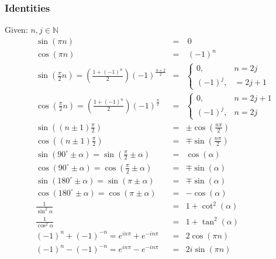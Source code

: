 \subsubsection{Identities}
Given: $n, j \in \mathbb{N}$
\begin{align*}
     & \sin(\pi n)                                                                      & = & \: 0                                                    \\
     & \cos(\pi n)                                                                      & = & \: {(-1)}^n                                             \\
     & \sin(\frac{\pi}{2}n) = \left(\frac{1 + {(-1)}^n}{2}\right){(-1)}^{\frac{n+2}{2}} & = & \begin{cases} 0, &n=2j \\ {(-1)}^j,&=2j+1 \end{cases}   \\
     & \cos(\frac{\pi}{2}n) = \left(\frac{1+{(-1)}^n}{2}\right){(-1)}^{\frac{n}{2}}     & = & \begin{cases} 0, &n=2j+1 \\ {(-1)}^j, &n=2j \end{cases} \\
     & \sin\left(\left(n\pm 1\right)\frac{\pi}{2}\right)                                & = & \pm \cos\left(\frac{n\pi}{2}\right)                     \\
     & \cos\left(\left(n\pm 1\right)\frac{\pi}{2}\right)                                & = & \mp \sin\left(\frac{n\pi}{2}\right)                     \\
     & \sin(90^\circ\pm\alpha) = \sin(\frac{\pi}{2} \pm \alpha)                         & = & \cos(\alpha)                                            \\
     & \cos(90^\circ\pm\alpha) = \cos(\frac{\pi}{2} \pm \alpha)                         & = & \mp\sin(\alpha)                                         \\
     & \sin(180^\circ\pm\alpha) = \sin(\pi \pm \alpha)                                  & = & \mp\sin(\alpha)                                         \\
     & \cos(180^\circ\pm\alpha) = \cos(\pi \pm \alpha)                                  & = & -\cos(\alpha)                                           \\
     & \frac{1}{\sin^2 \alpha}                                                          & = & 1+\cot^2 (\alpha)                                       \\
     & \frac{1}{\cos^2 \alpha}                                                          & = & 1+\tan^2 (\alpha)                                       \\
     & {(-1)}^n+{(-1)}^{-n}=e^{in\pi}+e^{-in\pi}                                        & = & 2\cos(\pi n)                                            \\
     & {(-1)}^n-{(-1)}^{-n}=e^{in\pi}-e^{-in\pi}                                        & = & 2i\sin(\pi n)
\end{align*}

